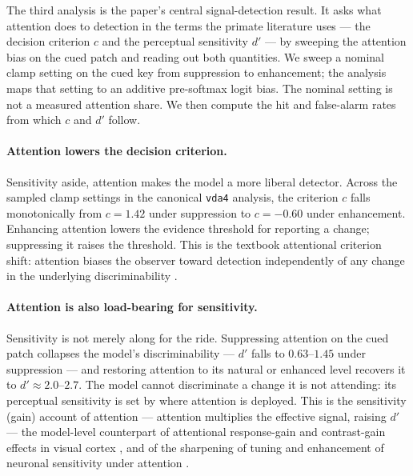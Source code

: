 The third analysis is the paper's central signal-detection result. It asks what
attention does to detection in the terms the primate literature uses --- the
decision criterion $c$ and the perceptual sensitivity $d'$ --- by sweeping the
attention bias on the cued patch and reading out both quantities. We sweep a nominal clamp setting on the cued key from suppression to enhancement;
the analysis maps that setting to an additive pre-softmax logit bias. The nominal
setting is not a measured attention share. We then compute the hit and
false-alarm rates from which $c$ and $d'$ follow.

\paragraph{Attention lowers the decision criterion.}
Sensitivity aside, attention makes the model a more liberal detector. Across the sampled clamp settings in the canonical \texttt{vda4} analysis, the
criterion $c$ falls monotonically from $c = 1.42$ under suppression to $c = -0.60$
under enhancement. Enhancing attention lowers the evidence threshold for reporting a
change; suppressing it raises the threshold. This is the textbook attentional
criterion shift: attention biases the observer toward detection independently of any
change in the underlying discriminability \cite{carrasco2011_visual_attention_25y}.

\paragraph{Attention is also load-bearing for sensitivity.}
Sensitivity is not merely along for the ride. Suppressing attention on the cued
patch collapses the model's discriminability --- $d'$ falls to $0.63$--$1.45$ under
suppression --- and restoring attention to its natural or enhanced level recovers it
to $d' \approx 2.0$--$2.7$. The model cannot discriminate a change it is not
attending: its perceptual sensitivity is set by where attention is deployed. This is
the sensitivity (gain) account of attention --- attention multiplies the effective
signal, raising $d'$ --- the model-level counterpart of attentional response-gain
and contrast-gain effects in visual cortex \cite{reynolds_heeger2009_normalization,
mcadams_maunsell1999_v4_tuning}, and of the sharpening of tuning and enhancement of
neuronal sensitivity under attention \cite{treue_martinez_trujillo1999_feature_attention}.

